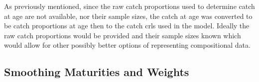\documentclass[11pt]{article}\usepackage[]{graphicx}\usepackage[]{color}
\begin{document}
As previously mentioned, since the raw catch proportions used to determine catch at age are not available, nor their sample sizes, the catch at age was converted to be catch proportions at age then to the catch \acrshort{crl}s used in the model. Ideally the raw catch proportions would be provided and their sample sizes known which would allow for other possibly better options of representing compositional data. 



\begin{table}[]
\centering
{}
\caption{The periods for landing bounds provided by Danny Ings, along with the description of how they relate and three sets of different upper and lower bound multipliers to be tested on \acrshort{spam}.}
\label{landTable}
\end{table}

\subsection{Smoothing Maturities and Weights}
\end{document}
